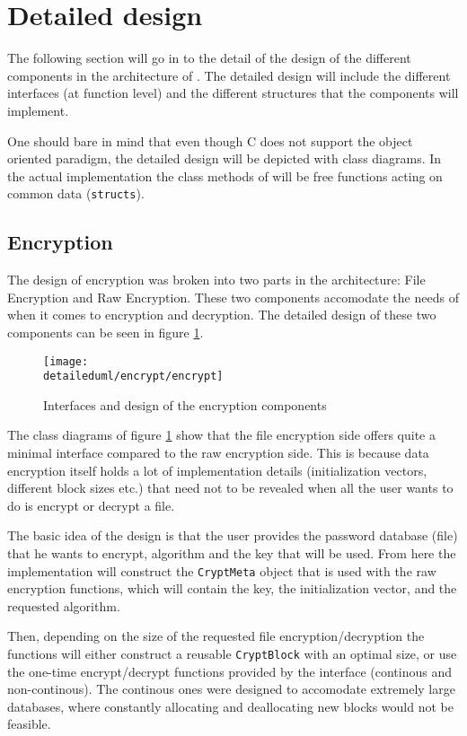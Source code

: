 \section{Detailed design}

The following section will go in to the detail of the design of the different
components in the architecture of \pman. The detailed design will include the
different interfaces (at function level) and the different structures that the
components will implement.

One should bare in mind that even though C does not support the object oriented
paradigm, the detailed design will be depicted with class diagrams. In the
actual implementation the class methods of will be free functions acting on
common data (\texttt{structs}).

\subsection{Encryption}

The design of encryption was broken into two parts in the architecture:
File Encryption and Raw Encryption. These two components accomodate the needs
of \pman when it comes to encryption and decryption. The detailed design of
these two components can be seen in figure \ref{dia:encrypt_design}.

\begin{figure}[H]
    \centering
    \centerline{\texttt{[image: \\detaileduml/encrypt/encrypt]}}
    \caption{Interfaces and design of the encryption components}
    \label{dia:encrypt_design}
\end{figure}

The class diagrams of figure \ref{dia:encrypt_design} show that the file
encryption side offers quite a minimal interface compared to the raw encryption
side. This is because data encryption itself holds a lot of implementation
details (initialization vectors, different block sizes etc.) that need not to
be revealed when all the user wants to do is encrypt or decrypt a file.

The basic idea of the design is that the user provides the password database
(file) that he wants to encrypt, algorithm and the key that will be used. From
here the implementation will construct the \texttt{CryptMeta} object that is
used with the raw encryption functions, which will contain the key, the
initialization vector, and the requested algorithm.

Then, depending on the size of the requested file encryption/decryption
the functions will either construct a reusable \texttt{CryptBlock} with an
optimal size, or use the one-time encrypt/decrypt functions provided by the
interface (continous and non-continous). The continous ones were designed
to accomodate extremely large databases, where constantly allocating and
deallocating new blocks would not be feasible.

